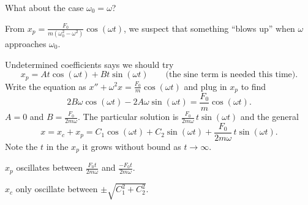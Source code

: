 \documentclass[10pt,aspectratio=169]{beamer}
\begin{document}
\begin{frame}
What about the case $\omega_0 = \omega$?

\medskip
\pause

From $x_p = \frac{F_0}{m(\omega_0^2 - \omega^2)} \cos (\omega t)$, we suspect
that something ``blows up'' when $\omega$ approaches $\omega_0$.

\medskip
\pause

Undetermined coefficients says we should try
\[
x_p = A t \cos (\omega t) + B t \sin (\omega t)
\qquad \text{(the sine term is needed this time)}.
\]
\pause
Write the equation as
\qquad $x'' + \omega^2 x = \frac{F_0}{m} \cos ( \omega t)$
\qquad and plug in $x_p$ to find
\[
2 B \omega \cos (\omega t) - 2 A \omega \sin (\omega t) = 
\frac{F_0}{m} \cos (\omega t) .
\]
\pause
$A = 0$ and $B = \frac{F_0}{2m\omega}$. \pause  The particular solution is
$\frac{F_0}{2m\omega} \, t \sin (\omega t)$ and the general
\[
x = x_c + x_p = C_1 \cos (\omega t) + C_2 \sin (\omega t)
+ \frac{F_0}{2m\omega} \, t \sin (\omega t) .
\]
Note the $t$ in the $x_p$ it grows without bound as $t \to \infty$.

$x_p$ oscillates between $\frac{F_0 t}{2m\omega}$ and
$\frac{- F_0 t}{2m\omega}$.

$x_c$ only oscillate between
$\pm\sqrt{C_1^2 + C_2^2}$.

\end{frame}
\end{document}
